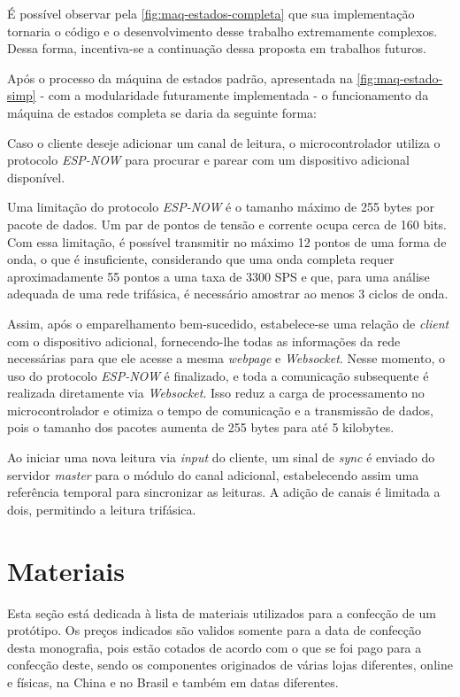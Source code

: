É possível observar pela \autoref{fig:maq-estados-completa} que sua implementação tornaria o código e o desenvolvimento desse trabalho extremamente complexos. Dessa forma, incentiva-se a continuação dessa proposta em trabalhos futuros.

Após o processo da máquina de estados padrão, apresentada na \autoref{fig:maq-estado-simp} - com a modularidade futuramente implementada - o funcionamento da máquina de estados completa se daria da seguinte forma:

Caso o cliente deseje adicionar um canal de leitura, o microcontrolador utiliza o protocolo \textit{ESP-NOW} para procurar e parear com um dispositivo adicional disponível.

Uma limitação do protocolo \textit{ESP-NOW} é o tamanho máximo de 255 bytes por pacote de dados. Um par de pontos de tensão e corrente ocupa cerca de 160 bits. Com essa limitação, é possível transmitir no máximo 12 pontos de uma forma de onda, o que é insuficiente, considerando que uma onda completa requer aproximadamente 55 pontos a uma taxa de 3300 \gls{SPS} e que, para uma análise adequada de uma rede trifásica, é necessário amostrar ao menos 3 ciclos de onda.

Assim, após o emparelhamento bem-sucedido, estabelece-se uma relação de \textit{client} com o dispositivo adicional, fornecendo-lhe todas as informações da rede necessárias para que ele acesse a mesma \textit{webpage} e \textit{Websocket}. Nesse momento, o uso do protocolo \textit{ESP-NOW} é finalizado, e toda a comunicação subsequente é realizada diretamente via \textit{Websocket}. Isso reduz a carga de processamento no microcontrolador e otimiza o tempo de comunicação e a transmissão de dados, pois o tamanho dos pacotes aumenta de 255 bytes para até 5 kilobytes.

Ao iniciar uma nova leitura via \textit{input} do cliente, um sinal de \textit{sync} é enviado do servidor \textit{master} para o módulo do canal adicional, estabelecendo assim uma referência temporal para sincronizar as leituras. A adição de canais é limitada a dois, permitindo a leitura trifásica.

\section{Materiais}\label{sec:materiais}

Esta seção está dedicada à lista de materiais utilizados para a confecção de um protótipo. Os preços indicados são validos somente para a data de confecção desta monografia, pois estão cotados de acordo com o que se foi pago para a confecção deste, sendo os componentes originados de várias lojas diferentes, online e físicas, na China e no Brasil e também em datas diferentes.

